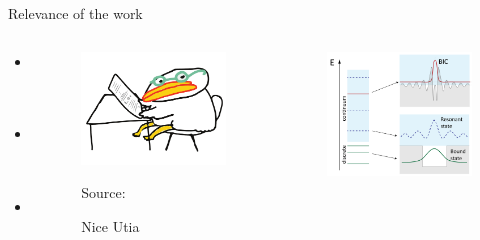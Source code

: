 \documentclass[
aspectratio=169,
16pt,
xcolor={dvipsnames} %
]{beamer}
\begin{document}
\begin{frame}[t]{Relevance of the work}
	\begin{columns}
		\begin{column}{0.2\linewidth}
			\begin{itemize}
				\item One
				\item Two
				\item Three				
			\end{itemize}
		\end{column}
		\begin{column}{0.3\linewidth}
			\begin{figure}
				\includegraphics[width=1.0\linewidth]{fig/Vector_fig}
				\caption{Nice Utia}
				 {\raggedright\tiny Source: \par}
			\end{figure}
		\end{column}
		\begin{column}{0.4\linewidth}
			\begin{figure}
				\includegraphics[width=0.9\linewidth]{fig/bicwiki0}

\end{figure}
\end{column}
\end{columns}
\end{frame}
\end{document}
